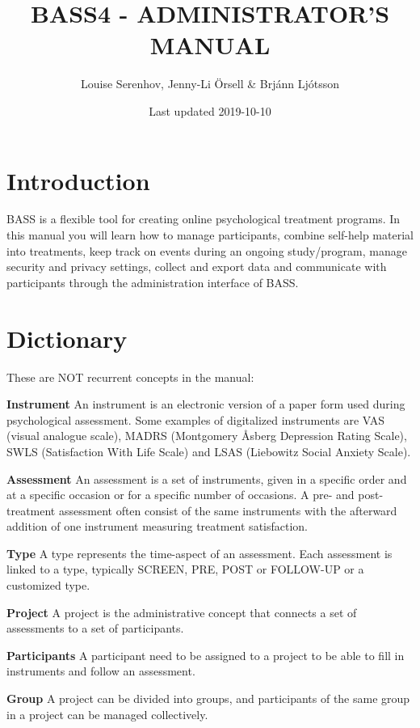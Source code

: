 \documentclass[]{book}
\title{BASS4 - ADMINISTRATOR'S MANUAL}
\author{Louise Serenhov, Jenny-Li Örsell \& Brjánn Ljótsson}
\date{Last updated 2019-10-10}
\begin{document}
\maketitle

{
\setcounter{tocdepth}{1}
\tableofcontents
}
\hypertarget{introduction}{%
\chapter{Introduction}\label{introduction}}

BASS is a flexible tool for creating online psychological treatment programs.
In this manual you will learn how to manage participants, combine self-help material into treatments, keep track on events during an ongoing study/program, manage security and privacy settings, collect and export data and communicate with participants through the administration interface of BASS.

\hypertarget{dictionary}{%
\chapter{Dictionary}\label{dictionary}}

These are NOT recurrent concepts in the manual:

\textbf{Instrument}
An instrument is an electronic version of a paper form used during psychological assessment. Some examples of digitalized instruments are VAS (visual analogue scale), MADRS (Montgomery Åsberg Depression Rating Scale), SWLS (Satisfaction With Life Scale) and LSAS (Liebowitz Social Anxiety Scale).

\textbf{Assessment}
An assessment is a set of instruments, given in a specific order and at a specific occasion or for a specific number of occasions. A pre- and post-treatment assessment often consist of the same instruments with the afterward addition of one instrument measuring treatment satisfaction.

\textbf{Type}
A type represents the time-aspect of an assessment. Each assessment is linked to a type, typically SCREEN, PRE, POST or FOLLOW-UP or a customized type.

\textbf{Project}
A project is the administrative concept that connects a set of assessments to a set of participants.

\textbf{Participants}
A participant need to be assigned to a project to be able to fill in instruments and follow an assessment.

\textbf{Group}
A project can be divided into groups, and participants of the same group in a project can be managed collectively.
\end{document}
